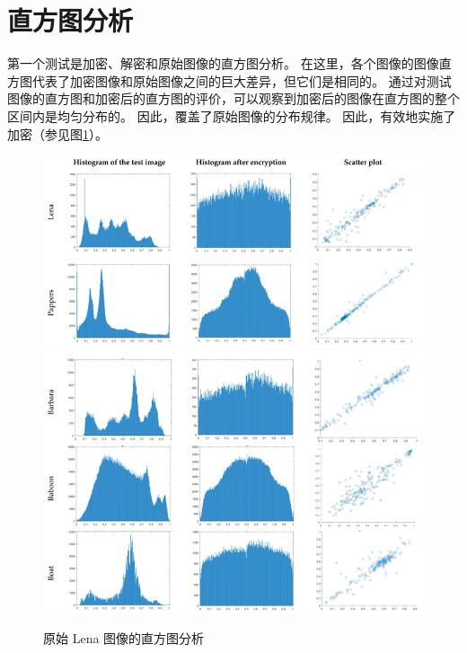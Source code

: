 \section{直方图分析}

第一个测试是加密、解密和原始图像的直方图分析。 
在这里，各个图像的图像直方图代表了加密图像和原始图像之间的巨大差异，但它们是相同的。 
通过对测试图像的直方图和加密后的直方图的评价，可以观察到加密后的图像在直方图的整个区间内是均匀分布的。 
因此，覆盖了原始图像的分布规律。 因此，有效地实施了加密（参见图\ref{fig:4.3}）。

\begin{figure}[ht]
    \begin{center}
        \includegraphics[width=\textwidth]{figure/p5.png}\\
        \includegraphics[width=\textwidth]{figure/p6.png}\\
    \end{center}
    \caption{原始 Lena 图像的直方图分析 \label{fig:4.3}}
\end{figure}